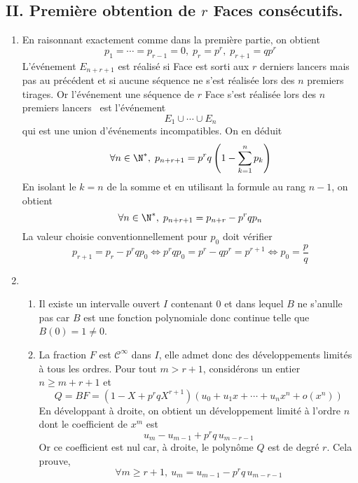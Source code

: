 \subsection*{II. Première obtention de $r$ Faces consécutifs.}
\begin{enumerate}
 \item En raisonnant exactement comme dans la première partie, on obtient 
 \begin{displaymath}
  p_1 = \cdots = p_{r-1} = 0, \; p_r = p^r, \; p_{r+1} = qp^r
 \end{displaymath}
L'événement $E_{n+r+1}$ est réalisé si Face est sorti aux $r$ derniers lancers mais pas au précédent et si aucune séquence ne s'est réalisée lors des $n$ premiers tirages. Or l'événement \og une séquence de $r$ Face s'est réalisée lors des $n$ premiers lancers\fg~ est l'événement 
\begin{displaymath}
 E_1 \cup \cdots \cup E_n
\end{displaymath}
qui est une union d'événements incompatibles. On en déduit
\begin{displaymath}
\forall n \in \N^*, \;  p_{n+r+1} = p^r q \left( 1 - \sum_{k=1}^{n}p_k\right) 
\end{displaymath}
En isolant le $k=n$ de la somme et en utilisant la formule au rang $n-1$, on obtient
\begin{displaymath}
 \forall n\in \N^*, \; p_{n+r+1} = p_{n+r} - p^r q p_n
\end{displaymath}
La valeur choisie conventionnellement pour $p_0$ doit vérifier
\begin{displaymath}
p_{r+1} = p_r -p^rq p_0 \Leftrightarrow p^rqp_0= p^r - qp^r = p^{r+1}\Leftrightarrow p_0 = \frac{p}{q} 
\end{displaymath}


 \item
\begin{enumerate}
 \item Il existe un intervalle ouvert $I$ contenant $0$ et dans lequel $B$ ne s'anulle pas car $B$ est une fonction polynomiale donc continue telle que $B(0)=1\neq0$.
 \item La fraction $F$ est $\mathcal{C}^{\infty}$ dans $I$, elle admet donc des développements limités à tous les ordres.\newline
 Pour tout $m>r+1$, considérons un entier $n\geq m+r+1$ et 
 \begin{displaymath}
Q = BF = \left( 1 - X + p^rq X^{r+1}\right) \left(u_0 + u_1x + \cdots + u_nx^n + o(x^n) \right)   
 \end{displaymath}
En développant à droite, on obtient un développement limité à l'ordre $n$ dont le coefficient de $x^m$ est
\begin{displaymath}
 u_m - u_{m-1} + p^rq\, u_{m-r-1}
\end{displaymath}
Or ce coefficient est nul car, à droite, le polynôme $Q$ est de degré $r$. Cela prouve,
\begin{displaymath}
 \forall m\geq r+1, \: u_m = u_{m-1} - p^rq\, u_{m-r-1}
\end{displaymath}
 

\end{enumerate}
\end{enumerate}
